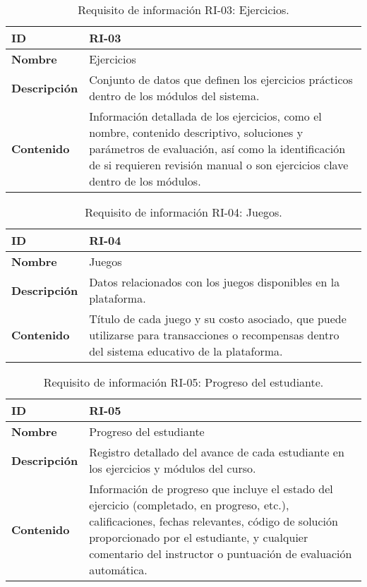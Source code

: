 \begin{table}[H]
    \centering
    \begin{tabular}{|l|p{9.5cm}|}
        \hline
        \textbf{ID} & RI-03 \\
        \hline
        \textbf{Nombre} & Ejercicios \\
        \hline
        \textbf{Descripción} & Conjunto de datos que definen los ejercicios prácticos dentro de los módulos del sistema.  \\
        \hline
        \textbf{Contenido} & Información detallada de los ejercicios, como el nombre, contenido descriptivo, soluciones y parámetros de evaluación, así como la identificación de si requieren revisión manual o son ejercicios clave dentro de los módulos.  \\
        \hline
    \end{tabular}
    \caption{Requisito de información RI-03: Ejercicios.}
    \label{table:req-RI05}
\end{table}

\begin{table}[H]
    \centering
    \begin{tabular}{|l|p{9.5cm}|}
        \hline
        \textbf{ID} & RI-04 \\
        \hline
        \textbf{Nombre} & Juegos \\
        \hline
        \textbf{Descripción} & Datos relacionados con los juegos disponibles en la plataforma. \\
        \hline
        \textbf{Contenido} & Título de cada juego y su costo asociado, que puede utilizarse para transacciones o recompensas dentro del sistema educativo de la plataforma. \\
        \hline
    \end{tabular}
    \caption{Requisito de información RI-04: Juegos.}
    \label{table:req-RI06}
\end{table}

\begin{table}[H]
    \centering
    \begin{tabular}{|l|p{9.5cm}|}
        \hline
        \textbf{ID} & RI-05 \\
        \hline
        \textbf{Nombre} & Progreso del estudiante \\
        \hline
        \textbf{Descripción} & Registro detallado del avance de cada estudiante en los ejercicios y módulos del curso. \\
        \hline
        \textbf{Contenido} & Información de progreso que incluye el estado del ejercicio (completado, en progreso, etc.), calificaciones, fechas relevantes, código de solución proporcionado por el estudiante, y cualquier comentario del instructor o puntuación de evaluación automática. \\
        \hline
    \end{tabular}
    \caption{Requisito de información RI-05: Progreso del estudiante.}
    \label{table:req-RI07}
\end{table}

